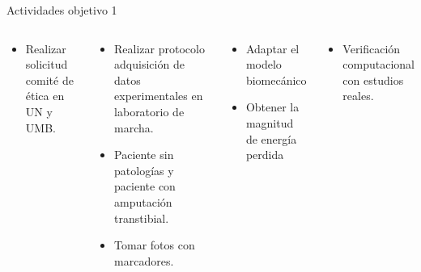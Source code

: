 \documentclass[10pt]{beamer}
\begin{document}
\begin{frame}{Actividades objetivo 1}

\begin{columns}[t]


\column{28 mm}
\begin{block}{}

\begin{itemize}
\item {\scriptsize{}Realizar solicitud comité de ética en UN y UMB.}{\scriptsize \par}
\end{itemize}
\end{block}

\column{40 mm}
\begin{block}{}

\begin{itemize}
\item {\scriptsize{}Realizar protocolo adquisición de datos experimentales
en laboratorio de marcha.}{\scriptsize \par}
\item {\scriptsize{}Paciente sin patologías y paciente con amputación transtibial.}{\scriptsize \par}
\item {\scriptsize{}Tomar fotos con marcadores.}{\scriptsize \par}
\end{itemize}
\end{block}

\column{25 mm}
\begin{block}{}

\begin{itemize}
\item {\scriptsize{}Adaptar el modelo biomecánico}{\scriptsize \par}
\item {\scriptsize{}Obtener la magnitud de energía perdida}{\scriptsize \par}
\end{itemize}
\end{block}

\column{30 mm}
\begin{block}{}

\begin{itemize}
\item {\scriptsize{}Verificación computacional con estudios reales.}{\scriptsize \par}
\end{itemize}
\end{block}
\end{columns}

\end{frame}
\end{document}

